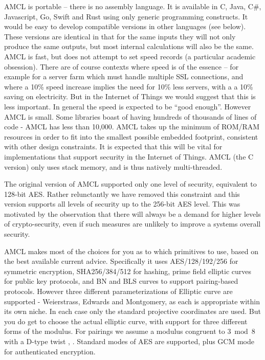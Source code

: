 \documentclass{llncs}
\begin{document}
AMCL is portable -- there is no assembly language. It is available in C, Java, C\#, Javascript, Go, Swift and Rust using only generic programming constructs. It would be easy to develop compatible 
versions in other languages (see below). These versions are identical in that for the same inputs they will not only produce the same outputs, but most internal calculations will also be the same. 
AMCL is fast, but does not attempt to set speed records (a particular academic obsession). There are of course contexts where speed is of the essence -- for example for a server farm which must handle 
multiple SSL connections, and where a 10\% speed increase implies the need for 10\% less servers, with a a 10\% saving on electricity. But in the Internet of Things we would suggest that this is less 
important. In general the speed
is expected to be ``good enough''. However AMCL is small. Some libraries boast of having hundreds of thousands of lines of code - AMCL has less than 10,000. AMCL takes up the minimum of 
ROM/RAM resources in order to fit into the smallest possible embedded footprint, consistent with other design constraints. It is expected that this will be vital for implementations that 
support security in the Internet of Things. AMCL (the C version) only uses stack memory, and is thus natively multi-threaded.

The original version of AMCL supported only one level of security, equivalent to 128-bit AES. Rather relunctantly we have removed this constraint and this version supports all levels of security up to
the 256-bit AES level. This was motivated by the observation that there will always be a demand for higher levels of crypto-security, even if such measures are unlikely to improve a systems overall security. 

AMCL makes most 
of the choices for you as to which primitives to use, based on the best available current advice. Specifically it uses AES/128/192/256 for symmetric encryption, SHA256/384/512 for hashing, prime field elliptic
curves for public key protocols, and BN and BLS curves to support pairing-based protocols. However three different parameterizations of Elliptic curve are supported - Weierstrass, Edwards and 
Montgomery, as each is appropriate within its own niche. In each case only the standard projective coordinates are used. But you do get to 
choose the actual elliptic curve, with support for three different 
forms of the modulus. For pairings we assume a modulus congruent to $3 \bmod 8$ with a D-type twist \cite{barreto-naehrig}, \cite{barreto-lynn-scott}.
Standard modes of AES are supported, plus GCM mode for authenticated encryption.
\end{document}
